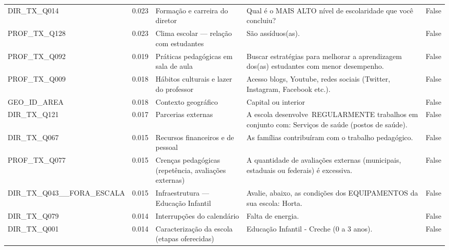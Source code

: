 \begin{tabular}{lrllr}
DIR\_TX\_Q014 & 0.023 & Formação e carreira do diretor & Qual é o MAIS ALTO nível de escolaridade que você concluiu? & False \\
PROF\_TX\_Q128 & 0.023 & Clima escolar — relação com estudantes & São assíduos(as). & False \\
PROF\_TX\_Q092 & 0.019 & Práticas pedagógicas em sala de aula & Buscar estratégias para melhorar a aprendizagem dos(as) estudantes com menor desempenho. & False \\
PROF\_TX\_Q009 & 0.018 & Hábitos culturais e lazer do professor & Acesso blogs, Youtube, redes sociais (Twitter, Instagram, Facebook etc.). & False \\
GEO\_ID\_AREA & 0.018 & Contexto geográfico & Capital ou interior & False \\
DIR\_TX\_Q121 & 0.017 & Parcerias externas & A escola desenvolve REGULARMENTE trabalhos em conjunto com: Serviços de saúde (postos de saúde). & False \\
DIR\_TX\_Q067 & 0.015 & Recursos financeiros e de pessoal & As famílias contribuíram com o trabalho pedagógico. & False \\
PROF\_TX\_Q077 & 0.015 & Crenças pedagógicas (repetência, avaliações externas) & A quantidade de avaliações externas (municipais, estaduais ou federais) é excessiva. & False \\
DIR\_TX\_Q043\_\_FORA\_ESCALA & 0.015 & Infraestrutura — Educação Infantil & Avalie, abaixo, as condições dos EQUIPAMENTOS da sua escola: Horta. & False \\
DIR\_TX\_Q079 & 0.014 & Interrupções do calendário & Falta de energia. & False \\
DIR\_TX\_Q001 & 0.014 & Caracterização da escola (etapas oferecidas) & Educação Infantil  -  Creche  (0 a 3 anos). & False \\
\bottomrule
\end{tabular}
